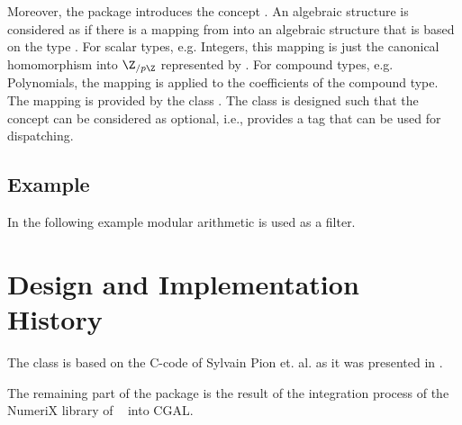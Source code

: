 Moreover, the package introduces the concept . 
An algebraic structure  is considered as  if there 
is a mapping from  into an algebraic structure that is based on 
the type .  
For scalar types, e.g. Integers, this mapping is just the canonical 
homomorphism into $\Z_{/p\Z}$ represented by . 
For compound types, e.g. Polynomials, the mapping is applied to the 
coefficients of the compound type. 
The mapping is provided by the class .
The class  is designed such that the concept 
 can be considered as optional, i.e., 
 provides a tag that can be used for dispatching. 

\subsection{Example}

In the following example modular arithmetic is used as a filter. 

\section{Design and Implementation History}

The class  is based on the C-code of Sylvain Pion et. al. 
as it was presented in \cite{bepp-sdrns-99}. 

The remaining part of the package is the result of the integration process
of the NumeriX library of \exacus\ \cite{beh+-eeeafcs-05} into CGAL.